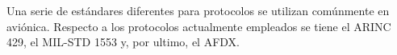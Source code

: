  Una serie de estándares diferentes para protocolos se utilizan comúnmente en avi\'onica.
 Respecto a los protocolos actualmente empleados se tiene el ARINC 429, el MIL-STD 1553 y, por ultimo, el AFDX.











